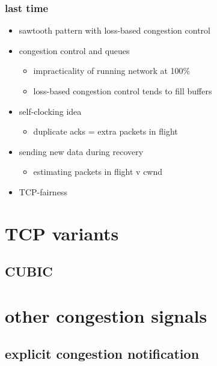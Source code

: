 \date{}
\title{}
\date{}
\usepackage{pgfplots}
\pgfplotsset{compat=1.16}

\begin{frame}
    \titlepage
\end{frame}

\begin{frame}
\frametitle{last time}
    \begin{itemize}
    \item sawtooth pattern with loss-based congestion control
    \item congestion control and queues
        \begin{itemize}
        \item impracticality of running network at 100\%
        \item loss-based congestion control tends to fill buffers
        \end{itemize}
    \item self-clocking idea
        \begin{itemize}
        \item duplicate acks = extra packets in flight
        \end{itemize}
    \item sending new data during recovery
        \begin{itemize}
        \item estimating packets in flight v cwnd
        \end{itemize}
    \item TCP-fairness
    \end{itemize}
\end{frame}

\section{TCP variants}


\subsection{CUBIC}


\section{other congestion signals}



\subsection{explicit congestion notification}


